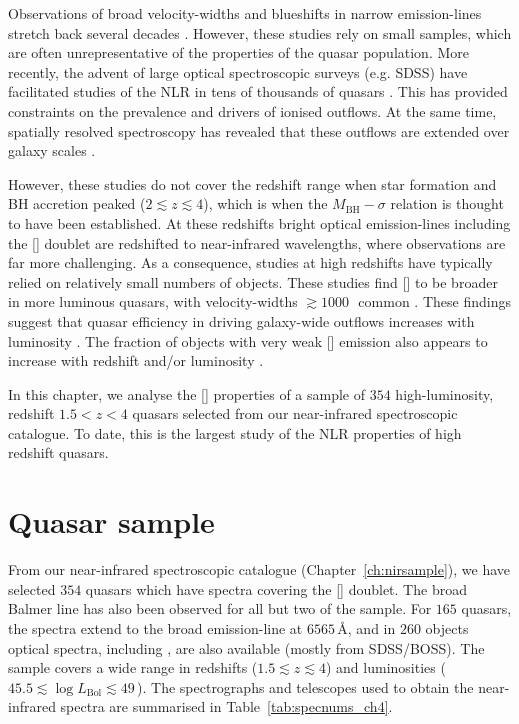 Observations of broad velocity-widths and blueshifts in narrow emission-lines stretch back several decades \citep[e.g.][]{weedman70,stockton76,heckman81,veron81,feldman82,heckman84,vrtilek85,whittle85,boroson92}.
However, these studies rely on small samples, which are often unrepresentative of the properties of the quasar population.
More recently, the advent of large optical spectroscopic surveys (e.g. SDSS) have facilitated studies of the NLR in tens of thousands of quasars \citep[e.g.][]{boroson05,greene05a,zhang11,mullaney13,zakamska14,shen14}.
This has provided constraints on the prevalence and drivers of ionised outflows.
At the same time, spatially resolved spectroscopy has revealed that these outflows are extended over galaxy scales \citep[e.g.][]{greene09,greene11,harrison12,hainline13,harrison14}.

However, these studies do not cover the redshift range when star formation and BH accretion peaked ($2 \lesssim z \lesssim 4$), which is when the $M_{\text{BH}}-\sigma$ relation is thought to have been established.
At these redshifts bright optical emission-lines including the [] doublet are redshifted to near-infrared wavelengths, where observations are far more challenging.
As a consequence, studies at high redshifts have typically relied on relatively small numbers of objects.
These studies find [] to be broader in more luminous quasars, with velocity-widths $\gtrsim1000$\,\kms\, common \citep[e.g.][]{netzer04,kim13,brusa15,shen16a}.
These findings suggest that quasar efficiency in driving galaxy-wide outflows increases with luminosity \citep[e.g.][]{netzer04,nesvadba08,kim13,brusa15,carniani15,perna15,bischetti16}.
The fraction of objects with very weak [] emission also appears to increase with redshift and/or luminosity \citep[e.g.][]{netzer04}.

In this chapter, we analyse the [] properties of a sample of $354$ high-luminosity, redshift $1.5 < z < 4$ quasars selected from our near-infrared spectroscopic catalogue.
To date, this is the largest study of the NLR properties of high redshift quasars.

\section{Quasar sample}

From our near-infrared spectroscopic catalogue (Chapter~\ref{ch:nirsample}), we have selected $354$ quasars which have spectra covering the [] doublet.
The broad Balmer \hb line has also been observed for all but two of the sample.
For $165$ quasars, the spectra extend to the broad \ha emission-line at $6565$\,\AA, and in $260$ objects optical spectra, including , are also available (mostly from SDSS/BOSS).
The sample covers a wide range in redshifts ($1.5 \lesssim z \lesssim 4$) and luminosities ($45.5 \lesssim \log L_{\text{Bol}} \lesssim 49$\,\ergs).
The spectrographs and telescopes used to obtain the near-infrared spectra are summarised in Table~\ref{tab:specnums_ch4}.

